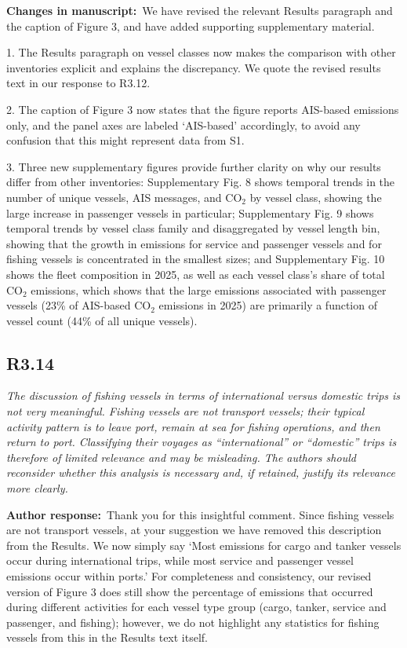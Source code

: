\documentclass[11pt]{article}
\newcommand{\point}[1]{\subsection*{\normalfont\bfseries #1}}
\newcommand{\response}{\par\medskip\noindent%
  \textbf{\textcolor{respblue}{Author response:}}\ }
\newcommand{\changes}{\par\medskip\noindent%
  \textbf{\textcolor{changegreen}{Changes in manuscript:}}\ }
\begin{document}
\changes We have revised the relevant Results paragraph and the caption of Figure 3, and have added supporting supplementary material.

1. The Results paragraph on vessel classes now makes the comparison with other inventories explicit and explains the discrepancy. We quote the revised results text in our response to R3.12.

2. The caption of Figure 3 now states that the figure reports AIS-based emissions only, and the panel axes are labeled `AIS-based' accordingly, to avoid any confusion that this might represent data from S1.

3. Three new supplementary figures provide further clarity on why our results differ from other inventories: Supplementary Fig. 8 shows temporal trends in the number of unique vessels, AIS messages, and CO$_{2}$ by vessel class, showing the large increase in passenger vessels in particular; Supplementary Fig. 9 shows temporal trends by vessel class family and disaggregated by vessel length bin, showing that the growth in emissions for service and passenger vessels and for fishing vessels is concentrated in the smallest sizes; and Supplementary Fig. 10 shows the fleet composition in 2025, as well as each vessel class's share of total CO$_{2}$ emissions, which shows that the large emissions associated with passenger vessels (23\% of AIS-based CO$_{2}$ emissions in 2025) are primarily a function of vessel count (44\% of all unique vessels).


\point{R3.14}

\begin{refquote}\itshape
The discussion of fishing vessels in terms of international versus domestic trips
is not very meaningful. Fishing vessels are not transport vessels; their typical
activity pattern is to leave port, remain at sea for fishing operations, and then
return to port. Classifying their voyages as ``international'' or ``domestic''
trips is therefore of limited relevance and may be misleading. The authors should
reconsider whether this analysis is necessary and, if retained, justify its
relevance more clearly.
\end{refquote}

\response Thank you for this insightful comment. Since fishing vessels are not transport vessels, at your suggestion we have removed this description from the Results. We now simply say `Most emissions for cargo and tanker vessels occur during international trips, while most service and passenger vessel emissions occur within ports.' For completeness and consistency, our revised version of Figure 3 does still show the percentage of emissions that occurred during different activities for each vessel type group (cargo, tanker, service and passenger, and fishing); however, we do not highlight any statistics for fishing vessels from this in the Results text itself.
\end{document}
